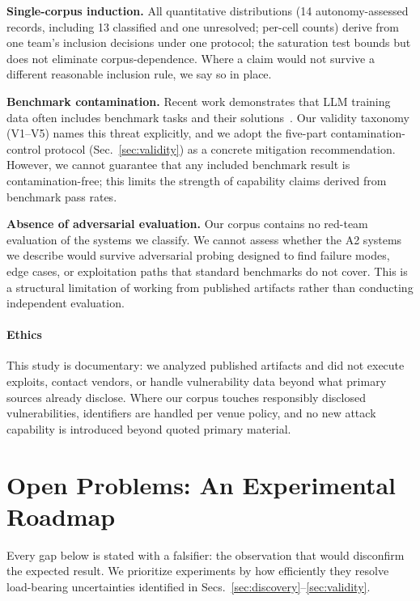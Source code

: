 \documentclass[conference,compsoc]{IEEEtran}
\begin{document}
\textbf{Single-corpus induction.} All quantitative distributions (14 autonomy-assessed records,
including 13 classified and one unresolved; per-cell counts) derive from one team's inclusion decisions under one protocol; the saturation
test bounds but does not eliminate corpus-dependence. Where a claim would not survive a
different reasonable inclusion rule, we say so in place.

\textbf{Benchmark contamination.} Recent work demonstrates that LLM training data often includes
benchmark tasks and their solutions~\cite{primevul2024,cvebench2025}. Our validity taxonomy
(V1--V5) names this threat explicitly, and we adopt the five-part contamination-control protocol
(Sec.~\ref{sec:validity}) as a concrete mitigation recommendation. However, we cannot guarantee
that any included benchmark result is contamination-free; this limits the strength of capability
claims derived from benchmark pass rates.

\textbf{Absence of adversarial evaluation.} Our corpus contains no red-team evaluation of the
systems we classify. We cannot assess whether the A2 systems we describe would survive
adversarial probing designed to find failure modes, edge cases, or exploitation paths that
standard benchmarks do not cover. This is a structural limitation of working from published
artifacts rather than conducting independent evaluation.

\paragraph{Ethics} This study is documentary: we analyzed published artifacts and did not
execute exploits, contact vendors, or handle vulnerability data beyond what primary sources
already disclose. Where our corpus touches responsibly disclosed vulnerabilities, identifiers
are handled per venue policy, and no new attack capability is introduced beyond quoted
primary material.

\vspace{6pt}
\section{Open Problems: An Experimental Roadmap}
\label{sec:roadmap}
Every gap below is stated with a falsifier: the observation that would disconfirm the
expected result. We prioritize experiments by how efficiently they resolve load-bearing
uncertainties identified in Secs.~\ref{sec:discovery}--\ref{sec:validity}.
\end{document}
